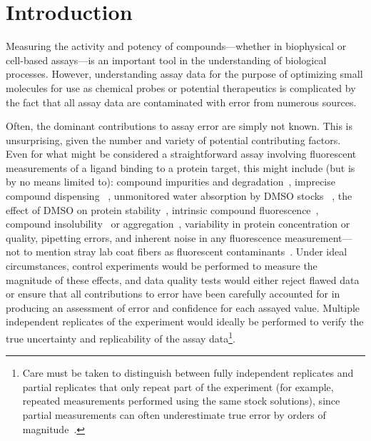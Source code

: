 \documentclass[aps,pre,twocolumn,nofootinbib,superscriptaddress,linenumbers]{revtex4-1}
\begin{document}
\maketitle

\section{Introduction}
\label{section:introduction}

Measuring the activity and potency of compounds---whether in biophysical or cell-based assays---is an important tool in the understanding of biological processes.
However, understanding assay data for the purpose of optimizing small molecules for use as chemical probes or potential therapeutics is complicated by the fact that all assay data are contaminated with error from numerous sources.

Often, the dominant contributions to assay error are simply not known.
This is unsurprising, given the number and variety of potential contributing factors.
Even for what might be considered a straightforward assay involving fluorescent measurements of a ligand binding to a protein target, this might include (but is by no means limited to): compound impurities and degradation~\cite{kozikowski_effect_2003,kozikowski_effect_2003-1,cheng_studies_2003,waybright_overcoming_2009}, imprecise compound dispensing  ~\cite{harris_gradient_2010,grant_achieving_2009}, unmonitored water absorption by DMSO stocks ~\cite{waybright_overcoming_2009}, the effect of DMSO on protein stability~\cite{tjernberg_dmso-related_2005}, intrinsic compound fluorescence~\cite{simeonov_fluorescence_2008,baell_new_2010}, compound insolubility~\cite{di_biological_2006} or aggregation~\cite{mcgovern_common_2002,mcgovern_kinase_2003,feng_high-throughput_2005,feng_synergy_2006,baell_new_2010}, variability in protein concentration or quality, pipetting errors, and inherent noise in any fluorescence measurement---not to mention stray lab coat fibers as fluorescent contaminants~\cite{busch_does_2015}. 
Under ideal circumstances, control experiments would be performed to measure the magnitude of these effects, and data quality tests would either reject flawed data or ensure that all contributions to error have been carefully accounted for in producing an assessment of error and confidence for each assayed value.
Multiple independent replicates of the experiment would ideally be performed to verify the true uncertainty and replicability of the assay data\footnote{Care must be taken to distinguish between fully independent replicates and partial replicates that only repeat part of the experiment (for example, repeated measurements performed using the same stock solutions), since partial measurements can often underestimate true error by orders of magnitude~\cite{chodera_entropy-enthalpy_2013}.}.
\end{document}
